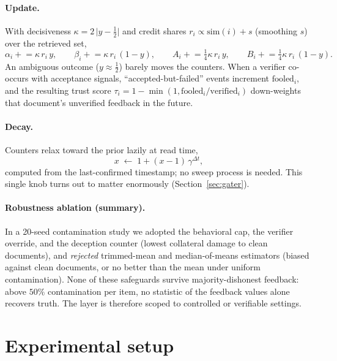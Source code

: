 \documentclass[11pt]{article}
\begin{document}
\paragraph{Update.} With decisiveness $\kappa = 2\,\lvert y - \tfrac12
\rvert$ and credit shares $r_i \propto \mathrm{sim}(i) + s$ (smoothing $s$)
over the retrieved set,
\begin{equation}
\alpha_i \mathrel{+}= \kappa\, r_i\, y, \qquad
\beta_i \mathrel{+}= \kappa\, r_i\,(1{-}y), \qquad
A_i \mathrel{+}= \tfrac14 \kappa\, r_i\, y, \qquad
B_i \mathrel{+}= \tfrac14 \kappa\, r_i\,(1{-}y).
\label{eq:update}
\end{equation}
An ambiguous outcome ($y \approx \tfrac12$) barely moves the counters. When a
verifier co-occurs with acceptance signals, ``accepted-but-failed'' events
increment $\mathrm{fooled}_i$, and the resulting trust score
$\tau_i = 1 - \min(1, \mathrm{fooled}_i/\mathrm{verified}_i)$ down-weights
that document's unverified feedback in the future.

\paragraph{Decay.} Counters relax toward the prior lazily at read time,
\begin{equation}
x \;\leftarrow\; 1 + (x - 1)\,\gamma^{\Delta t},
\label{eq:decay}
\end{equation}
computed from the last-confirmed timestamp; no sweep process is needed. This
single knob turns out to matter enormously (Section~\ref{sec:gater}).

\paragraph{Robustness ablation (summary).} In a 20-seed contamination study
we adopted the behavioral cap, the verifier override, and the deception
counter (lowest collateral damage to clean documents), and \emph{rejected}
trimmed-mean and median-of-means estimators (biased against clean documents,
or no better than the mean under uniform contamination). None of these
safeguards survive majority-dishonest feedback: above $50\%$ contamination
per item, no statistic of the feedback values alone recovers truth. The layer
is therefore scoped to controlled or verifiable settings.

\section{Experimental setup}
\label{sec:setup}
\end{document}
